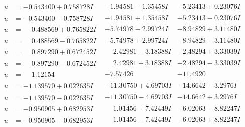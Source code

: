 \documentclass[1p]{elsarticle_modified}
\theoremstyle{definition}
\begin{document}
$$\begin{array}{c|c|c}
\begin{aligned}
u &= -0.543400 + 0.758728 I\end{aligned}
 & -1.94581 - 1.35458 I & -5.23413 + 0.23076 I \\ \hline\begin{aligned}
u &= -0.543400 - 0.758728 I\end{aligned}
 & -1.94581 + 1.35458 I & -5.23413 - 0.23076 I \\ \hline\begin{aligned}
u &= \phantom{-}0.488569 + 0.765822 I\end{aligned}
 & -5.74978 - 2.99724 I & -8.94829 + 3.11480 I \\ \hline\begin{aligned}
u &= \phantom{-}0.488569 - 0.765822 I\end{aligned}
 & -5.74978 + 2.99724 I & -8.94829 - 3.11480 I \\ \hline\begin{aligned}
u &= \phantom{-}0.897290 + 0.672452 I\end{aligned}
 & \phantom{-}2.42981 - 3.18388 I & -2.48294 + 3.33039 I \\ \hline\begin{aligned}
u &= \phantom{-}0.897290 - 0.672452 I\end{aligned}
 & \phantom{-}2.42981 + 3.18388 I & -2.48294 - 3.33039 I \\ \hline\begin{aligned}
u &= \phantom{-}1.12154\phantom{ +0.000000I}\end{aligned}
 & -7.57426\phantom{ +0.000000I} & -11.4920\phantom{ +0.000000I} \\ \hline\begin{aligned}
u &= -1.139570 + 0.022635 I\end{aligned}
 & -11.30750 + 4.69703 I & -14.6642 - 3.2976 I \\ \hline\begin{aligned}
u &= -1.139570 - 0.022635 I\end{aligned}
 & -11.30750 - 4.69703 I & -14.6642 + 3.2976 I \\ \hline\begin{aligned}
u &= -0.950905 + 0.682953 I\end{aligned}
 & \phantom{-}1.01456 + 7.42449 I & -6.02063 - 8.82247 I \\ \hline\begin{aligned}
u &= -0.950905 - 0.682953 I\end{aligned}
 & \phantom{-}1.01456 - 7.42449 I & -6.02063 + 8.82247 I \\ \hline\begin{aligned}

\end{aligned}
\end{array}$$
\end{document}
